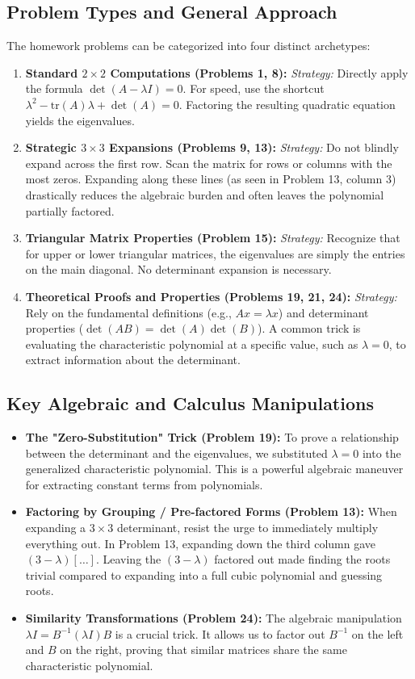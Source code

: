 \documentclass[11pt, a4paper]{article}
\theoremstyle{definition}
\theoremstyle{remark}
\begin{document}
\subsection{Problem Types and General Approach}
The homework problems can be categorized into four distinct archetypes:
\begin{enumerate}
    \item \textbf{Standard $2 \times 2$ Computations (Problems 1, 8):} 
    \textit{Strategy:} Directly apply the formula $\det(A - \lambda I) = 0$. For speed, use the shortcut $\lambda^2 - \text{tr}(A)\lambda + \det(A) = 0$. Factoring the resulting quadratic equation yields the eigenvalues.
    \item \textbf{Strategic $3 \times 3$ Expansions (Problems 9, 13):} 
    \textit{Strategy:} Do not blindly expand across the first row. Scan the matrix for rows or columns with the most zeros. Expanding along these lines (as seen in Problem 13, column 3) drastically reduces the algebraic burden and often leaves the polynomial partially factored.
    \item \textbf{Triangular Matrix Properties (Problem 15):} 
    \textit{Strategy:} Recognize that for upper or lower triangular matrices, the eigenvalues are simply the entries on the main diagonal. No determinant expansion is necessary.
    \item \textbf{Theoretical Proofs and Properties (Problems 19, 21, 24):} 
    \textit{Strategy:} Rely on the fundamental definitions (e.g., $Ax = \lambda x$) and determinant properties ($\det(AB) = \det(A)\det(B)$). A common trick is evaluating the characteristic polynomial at a specific value, such as $\lambda = 0$, to extract information about the determinant.
\end{enumerate}

\subsection{Key Algebraic and Calculus Manipulations}
\begin{itemize}
    \item \textbf{The "Zero-Substitution" Trick (Problem 19):} To prove a relationship between the determinant and the eigenvalues, we substituted $\lambda = 0$ into the generalized characteristic polynomial. This is a powerful algebraic maneuver for extracting constant terms from polynomials.
    \item \textbf{Factoring by Grouping / Pre-factored Forms (Problem 13):} When expanding a $3 \times 3$ determinant, resist the urge to immediately multiply everything out. In Problem 13, expanding down the third column gave $(3-\lambda)[\dots]$. Leaving the $(3-\lambda)$ factored out made finding the roots trivial compared to expanding into a full cubic polynomial and guessing roots.
    \item \textbf{Similarity Transformations (Problem 24):} The algebraic manipulation $\lambda I = B^{-1}(\lambda I)B$ is a crucial trick. It allows us to factor out $B^{-1}$ on the left and $B$ on the right, proving that similar matrices share the same characteristic polynomial.
\end{itemize}
\end{document}
